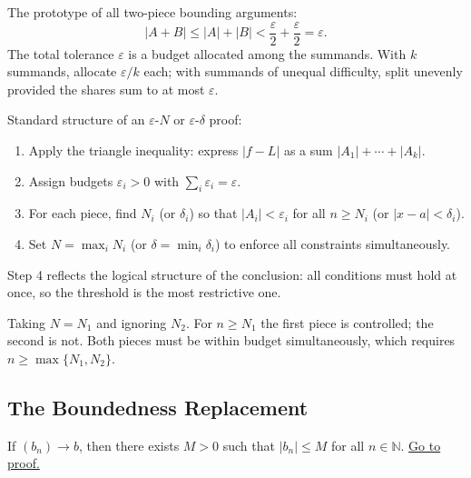 The prototype of all two-piece bounding arguments:
\[
  |A+B|\leq|A|+|B|<\frac{\varepsilon}{2}+\frac{\varepsilon}{2}=\varepsilon.
\]
The total tolerance $\varepsilon$ is a budget allocated among the summands.
With $k$ summands, allocate $\varepsilon/k$ each; with summands of unequal
difficulty, split unevenly provided the shares sum to at most $\varepsilon$.

\begin{remark}
\label{rem:four-step}
Standard structure of an $\varepsilon$-$N$ or $\varepsilon$-$\delta$ proof:
\begin{enumerate}
  \item Apply the triangle inequality: express $|f-L|$ as a sum
        $|A_1|+\cdots+|A_k|$.
  \item Assign budgets $\varepsilon_i>0$ with $\sum_i\varepsilon_i=\varepsilon$.
  \item For each piece, find $N_i$ (or $\delta_i$) so that
        $|A_i|<\varepsilon_i$ for all $n\geq N_i$ (or $|x-a|<\delta_i$).
  \item Set $N=\max_i N_i$ (or $\delta=\min_i\delta_i$) to enforce all
        constraints simultaneously.
\end{enumerate}
Step 4 reflects the logical structure of the conclusion: all conditions must
hold at once, so the threshold is the most restrictive one.
\end{remark}

\begin{remark}
Taking $N=N_1$ and ignoring $N_2$. For $n\geq N_1$ the first piece is
controlled; the second is not. Both pieces must be within budget simultaneously,
which requires $n\geq\max\{N_1,N_2\}$.
\end{remark}



\subsection*{The Boundedness Replacement}
\label{subsec:boundedness-replacement}

\begin{proposition}
\label{prop:convergent-bounded}
If $(b_n)\to b$, then there exists $M>0$ such that $|b_n|\leq M$ for all
$n\in\mathbb{N}$.
\hyperref[prf:convergent-bounded]{Go to proof.}
\end{proposition}

